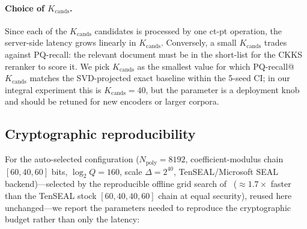 \paragraph{Choice of $K_{\mathrm{cands}}$.} Since each of the
$K_{\mathrm{cands}}$ candidates is processed by one ct-pt operation, the
server-side latency grows linearly in $K_{\mathrm{cands}}$. Conversely, a
small $K_{\mathrm{cands}}$ trades against PQ-recall: the relevant
document must be in the short-list for the CKKS reranker to score it.
We pick $K_{\mathrm{cands}}$ as the smallest value for which
PQ-recall@$K_{\mathrm{cands}}$ matches the SVD-projected exact baseline
within the 5-seed CI; in our integral experiment this is
$K_{\mathrm{cands}} = 40$, but the parameter is a deployment knob and
should be retuned for new encoders or larger corpora.

\subsection{Cryptographic reproducibility}\label{ssec:crypto-detail}

For the auto-selected configuration
($N_{\mathrm{poly}} = 8192$, coefficient-modulus chain $[60,40,60]$ bits,
$\log_2 Q = 160$, scale $\Delta = 2^{40}$, TenSEAL/Microsoft SEAL
backend)---selected by the reproducible offline grid search of~\cite{ref_vkit,ref_alpha}
($\approx 1.7\times$ faster than the TenSEAL stock $[60,40,40,60]$ chain at equal
security), reused here unchanged---we report the parameters needed to reproduce the cryptographic
budget rather than only the latency:

